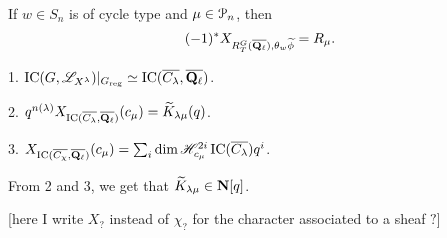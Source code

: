 \documentclass{article}
\begin{document}
\begin{theorem}[Lusztig, 1998]
If $w\in S_n$ is of cycle type and $\mu\in \mathcal{P}_n$, then 
\[
  (-1)^\ast X_{R_T^G(\overline{\mathbf{Q}_\ell}), \theta_w\widetilde\phi} = R_\mu .
\]
\end{theorem}

\begin{theorem}[Lusztig, 1981]
1. $\operatorname{IC}(G, \mathscr{L}_{X^\lambda})|_{G_{\mathrm{reg}}} \simeq \operatorname{IC}(\overline{C_\lambda}, \overline{\mathbf{Q}_\ell})$. 

2. $q^{n(\lambda)} X_{\operatorname{IC}(\overline{C_\lambda}, \overline{\mathbf{Q}_\ell})}(c_\mu) = \widetilde K_{\lambda\mu}(q)$. 

3. $X_{\operatorname{IC}(\overline{C_\chi},\overline{\mathbf{Q}_\ell})}(c_\mu) = \sum_i \dim \mathscr{H}_{c_\mu}^{2 i} \operatorname{IC}(\overline{C_\lambda}) q^i$. 
\end{theorem}

From 2 and 3, we get that $\widetilde K_{\lambda\mu}\in \mathbf{N}[q]$. 

[here I write $X_?$ instead of $\chi_?$ for the character associated to a sheaf 
$?$]







\end{document}
